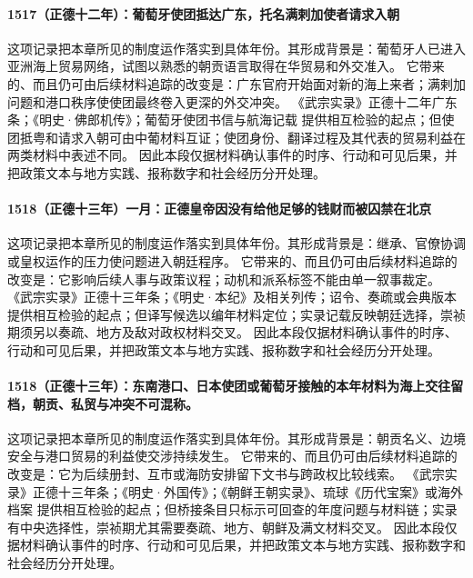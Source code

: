 \paragraph{1517（正德十二年）：葡萄牙使团抵达广东，托名满剌加使者请求入朝} 这项记录把本章所见的制度运作落实到具体年份。其形成背景是：葡萄牙人已进入亚洲海上贸易网络，试图以熟悉的朝贡语言取得在华贸易和外交准入。 它带来的、而且仍可由后续材料追踪的改变是：广东官府开始面对新的海上来者；满剌加问题和港口秩序使使团最终卷入更深的外交冲突。 《武宗实录》正德十二年广东条；《明史·佛郎机传》；葡萄牙使团书信与航海记载 提供相互检验的起点；但使团抵粤和请求入朝可由中葡材料互证；使团身份、翻译过程及其代表的贸易利益在两类材料中表述不同。 因此本段仅据材料确认事件的时序、行动和可见后果，并把政策文本与地方实践、报称数字和社会经历分开处理。

\paragraph{1518（正德十三年）一月：正德皇帝因没有给他足够的钱财而被囚禁在北京} 这项记录把本章所见的制度运作落实到具体年份。其形成背景是：继承、官僚协调或皇权运作的压力使问题进入朝廷程序。 它带来的、而且仍可由后续材料追踪的改变是：它影响后续人事与政策议程；动机和派系标签不能由单一叙事裁定。 《武宗实录》正德十三年条；《明史·本纪》及相关列传；诏令、奏疏或会典版本 提供相互检验的起点；但译写候选以编年材料定位；实录记载反映朝廷选择，崇祯期须另以奏疏、地方及敌对政权材料交叉。 因此本段仅据材料确认事件的时序、行动和可见后果，并把政策文本与地方实践、报称数字和社会经历分开处理。

\paragraph{1518（正德十三年）：东南港口、日本使团或葡萄牙接触的本年材料为海上交往留档，朝贡、私贸与冲突不可混称。} 这项记录把本章所见的制度运作落实到具体年份。其形成背景是：朝贡名义、边境安全与港口贸易的利益使交涉持续发生。 它带来的、而且仍可由后续材料追踪的改变是：它为后续册封、互市或海防安排留下文书与跨政权比较线索。 《武宗实录》正德十三年条；《明史·外国传》；《朝鲜王朝实录》、琉球《历代宝案》或海外档案 提供相互检验的起点；但桥接条目只标示可回查的年度问题与材料链；实录有中央选择性，崇祯期尤其需要奏疏、地方、朝鲜及满文材料交叉。 因此本段仅据材料确认事件的时序、行动和可见后果，并把政策文本与地方实践、报称数字和社会经历分开处理。

